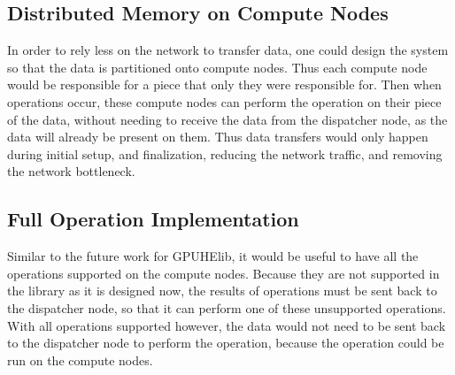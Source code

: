 \subsection{Distributed Memory on Compute Nodes}
In order to rely less on the network to transfer data, one could design the system so that the data is partitioned onto compute nodes. Thus each compute node would be responsible for a piece that only they were responsible for. Then when operations occur, these compute nodes can perform the operation on their piece of the data, without needing to receive the data from the dispatcher node, as the data will already be present on them. Thus data transfers would only happen during initial setup, and finalization, reducing the network traffic, and removing the network bottleneck.

\subsection{Full Operation Implementation}
Similar to the future work for GPUHElib, it would be useful to have all the operations supported on the compute nodes. Because they are not supported in the library as it is designed now, the results of operations must be sent back to the dispatcher node, so that it can perform one of these unsupported operations. With all operations supported however, the data would not need to be sent back to the dispatcher node to perform the operation, because the operation could be run on the compute nodes.